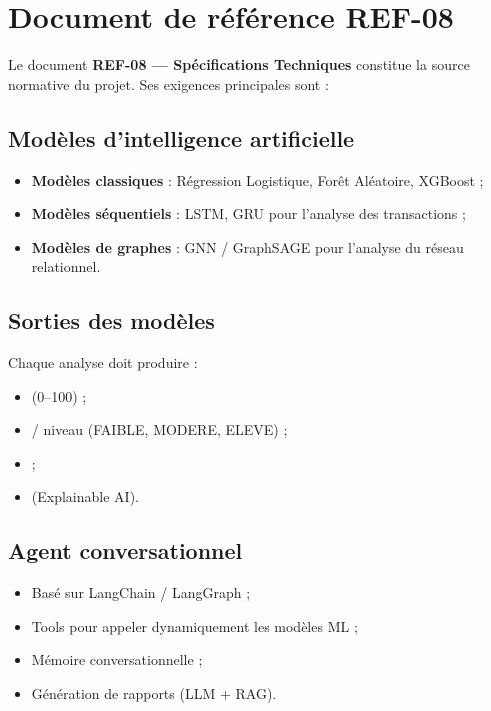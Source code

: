 \section{Document de référence REF-08}

Le document \textbf{REF-08 — Spécifications Techniques} constitue la source normative du projet. Ses exigences principales sont :

\subsection{Modèles d'intelligence artificielle}

\begin{itemize}[leftmargin=*]
  \item \textbf{Modèles classiques} : Régression Logistique, Forêt Aléatoire, XGBoost ;
  \item \textbf{Modèles séquentiels} : LSTM, GRU pour l'analyse des transactions ;
  \item \textbf{Modèles de graphes} : GNN / GraphSAGE pour l'analyse du réseau relationnel.
\end{itemize}

\subsection{Sorties des modèles}

Chaque analyse doit produire :
\begin{itemize}[leftmargin=*]
  \item {} (0--100) ;
  \item {} / niveau (FAIBLE, MODERE, ELEVE) ;
  \item {} ;
  \item {} (Explainable AI).
\end{itemize}

\subsection{Agent conversationnel}

\begin{itemize}[leftmargin=*]
  \item Basé sur LangChain / LangGraph ;
  \item Tools pour appeler dynamiquement les modèles ML ;
  \item Mémoire conversationnelle ;
  \item Génération de rapports (LLM + RAG).
\end{itemize}

